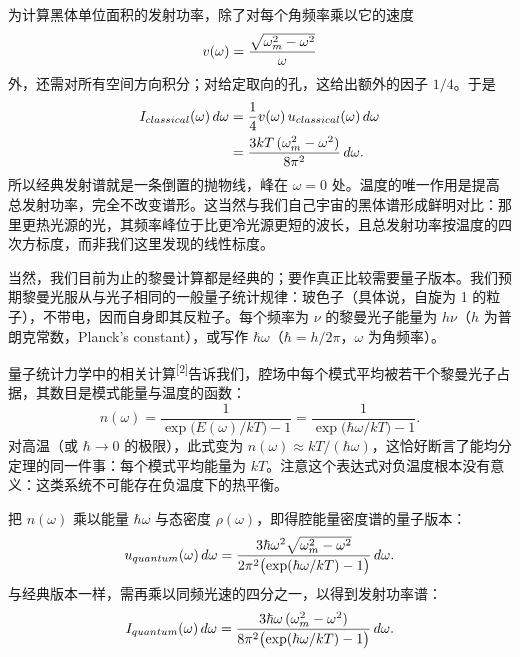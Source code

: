 为计算黑体单位面积的发射功率，除了对每个角频率乘以它的速度
\begin{equation}
v(\omega)=\frac{\sqrt{\omega_m^{2}-\omega^{2}}}{\omega}
\end{equation}
外，还需对所有空间方向积分；对给定取向的孔，这给出额外的因子 $1/4$。于是
\begin{align}
I_{classical}(\omega)\,d\omega
&=\frac14 v(\omega)\,u_{classical}(\omega)\,d\omega \nonumber\\
&=\frac{3kT\,(\omega_m^{2}-\omega^{2})}{8\pi^{2}}\,d\omega .
\end{align}
所以经典发射谱就是一条倒置的抛物线，峰在 $\omega=0$ 处。温度的唯一作用是提高总发射功率，完全不改变谱形。这当然与我们自己宇宙的黑体谱形成鲜明对比：那里更热光源的光，其频率峰位于比更冷光源更短的波长，且总发射功率按温度的四次方标度，而非我们这里发现的线性标度。

当然，我们目前为止的黎曼计算都是经典的；要作真正比较需要量子版本。我们预期黎曼光服从与光子相同的一般量子统计规律：玻色子（具体说，自旋为 1 的粒子），不带电，因而自身即其反粒子。每个频率为 $\nu$ 的黎曼光子能量为 $h\nu$（$h$ 为普朗克常数，Planck's constant），或写作 $\hbar\omega$（$\hbar=h/2\pi$，$\omega$ 为角频率）。

量子统计力学中的相关计算\textsuperscript{[2]}告诉我们，腔场中每个模式平均被若干个黎曼光子占据，其数目是模式能量与温度的函数：
\begin{equation}
n(\omega)=\frac{1}{\exp\!\bigl(E(\omega)/kT\bigr)-1}=\frac{1}{\exp\!\bigl(\hbar\omega/kT\bigr)-1}.
\end{equation}
对高温（或 $\hbar\to0$ 的极限），此式变为 $n(\omega)\approx kT/(\hbar\omega)$，这恰好断言了能均分定理的同一件事：每个模式平均能量为 $kT$。注意这个表达式对负温度根本没有意义：这类系统不可能存在负温度下的热平衡。

把 $n(\omega)$ 乘以能量 $\hbar\omega$ 与态密度 $\rho(\omega)$，即得腔能量密度谱的量子版本：
\begin{equation}
u_{quantum}(\omega)\,d\omega
=\frac{3\hbar\omega^{2}\sqrt{\omega_m^{2}-\omega^{2}}}{2\pi^{2}\bigl(\exp(\hbar\omega/kT)-1\bigr)}\,d\omega .
\end{equation}
与经典版本一样，需再乘以同频光速的四分之一，以得到发射功率谱：
\begin{equation}
I_{quantum}(\omega)\,d\omega
=\frac{3\hbar\omega\,(\omega_m^{2}-\omega^{2})}{8\pi^{2}\bigl(\exp(\hbar\omega/kT)-1\bigr)}\,d\omega .
\end{equation}


